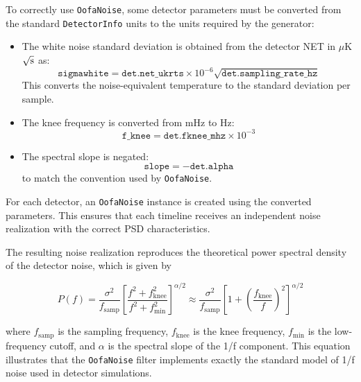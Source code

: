 To correctly use \texttt{OofaNoise}, some detector parameters must be converted from the standard \texttt{DetectorInfo} units to the units required by the generator:
\begin{itemize}
    \item The white noise standard deviation is obtained from the detector NET in $\mu$K$\sqrt{\rm s}$ as:
    \[
        \texttt{sigmawhite} = \texttt{det.net\_ukrts} \times 10^{-6} \sqrt{\texttt{det.sampling\_rate\_hz}}
    \]
    This converts the noise-equivalent temperature to the standard deviation per sample.
    \item The knee frequency is converted from mHz to Hz:
    \[
        \texttt{f\_knee} = \texttt{det.fknee\_mhz} \times 10^{-3}
    \]
    \item The spectral slope is negated:
    \[
        \texttt{slope} = -\texttt{det.alpha}
    \]
    to match the convention used by \texttt{OofaNoise}.
\end{itemize}

For each detector, an \texttt{OofaNoise} instance is created using the converted parameters. This ensures that each timeline receives an independent noise realization with the correct PSD characteristics.

The resulting noise realization reproduces the theoretical power spectral density of the detector noise, which is given by

\begin{equation}
P(f) = \frac{\sigma^{2}}{f_{\text{samp}}} \left[ \frac{f^{2} + f_{\text{knee}}^{2}}{f^{2} + f_{\text{min}}^{2}} \right]^{\alpha/2} \approx \frac{\sigma^{2}}{f_{\text{samp}}} \left[ 1 + \left( \frac{f_{\text{knee}}}{f} \right)^{2} \right]^{\alpha/2}
\end{equation}

where $f_\text{samp}$ is the sampling frequency, $f_\text{knee}$ is the knee frequency, $f_\text{min}$ is the low-frequency cutoff, and $\alpha$ is the spectral slope of the 1/f component. This equation illustrates that the \texttt{OofaNoise} filter implements exactly the standard model of 1/f noise used in detector simulations.
\bigskip


